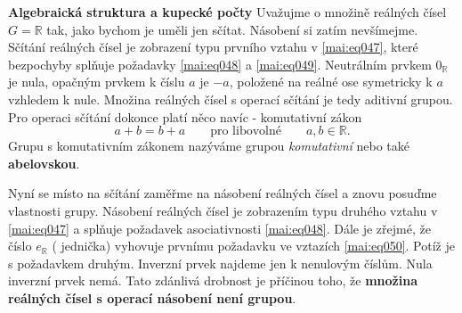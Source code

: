 \wikitextrule
\begin{example}\label{mai:exam047}
  \textbf{Algebraická struktura a kupecké počty}\newline\small
    Uvažujme o množině reálných čísel \(G = \mathbb{R}\) tak, jako bychom je uměli jen 
    sčítat. Násobení si zatím nevšímejme. Sčítání reálných čísel je zobrazení typu prvního 
    vztahu v \ref{mai:eq047}, které bezpochyby splňuje požadavky \ref{mai:eq048} a 
    \ref{mai:eq049}. Neutrálním prvkem \(0_\mathbb{R}\) je  nula, opačným prvkem k 
    číslu \(a\) je \(-a\), položené na reálné ose symetricky k \(a\) vzhledem k nule. Množina 
    reálných čísel s operací sčítání je tedy aditivní grupou. Pro operaci sčítání dokonce platí 
    něco navíc - komutativní zákon
    \begin{equation}\label{mai:eq051}
      a + b = b + a \qquad\text{pro libovolné}\qquad a,b\in\mathbb{R}.
    \end{equation} 
    Grupu s komutativním zákonem nazýváme grupou \emph{komutativní} nebo také \textbf{abelovskou}.
    
    
    Nyní se místo na sčítání zaměřme na násobení reálných čísel a znovu posuďme vlastnosti grupy. 
    Násobení reálných čísel je zobrazením typu druhého vztahu v \ref{mai:eq047} a splňuje požadavek 
    asociativnosti \ref{mai:eq048}. Dále je zřejmé, že číslo \(e_\mathbb{R}\) ( 
    jednička) vyhovuje prvnímu požadavku ve vztazích \ref{mai:eq050}. Potíž je s požadavkem druhým. 
    Inverzní prvek najdeme jen k nenulovým číslům. Nula inverzní prvek nemá. Tato zdánlivá drobnost 
    je příčinou toho, že \textbf{množina reálných čísel s operací násobení není grupou}.
  \normalsize
\end{example}
